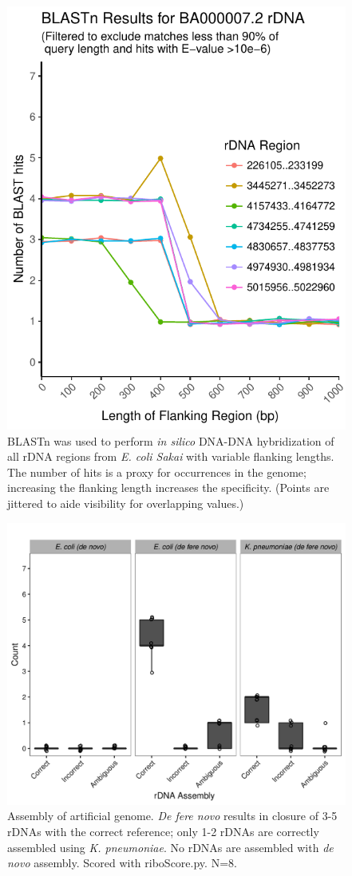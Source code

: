 \documentclass[10pt]{article}
\begin{document}
\begin{figure}[H]
    \centering
    \hspace*{0cm}\includegraphics[width=.5\textwidth]{grouped_sakai_BLAST_results}
    \caption{BLASTn was used to perform \textit{in silico} DNA-DNA hybridization of all rDNA regions from \textit{E. coli Sakai} with variable flanking lengths. The number of hits is a proxy for occurrences in the genome; increasing the flanking length increases the specificity. (Points are jittered to aide visibility for overlapping values.)}
    \label{fig:blast}
  \end{figure}

\begin{figure}[H]
    \centering
    \hspace*{0cm}\includegraphics[width=.60\textwidth]{simulated_genome}
    \caption{Assembly of artificial genome. \textit{De fere novo} results in closure of 3-5 rDNAs with the correct reference; only 1-2 rDNAs are correctly assembled using \textit{K. pneumoniae}.  No rDNAs are assembled with \textit{de novo} assembly. Scored with riboScore.py. N=8.}
    \label{fig:simgenome}
\end{figure}
\end{document}
